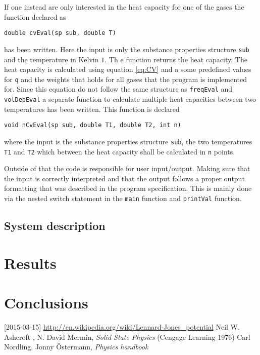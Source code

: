 \documentclass[11pt]{article}
\begin{document}
If one instead are only interested in the heat capacity for one of the gases the function declared as
\begin{lstlisting}
double cvEval(sp sub, double T)
\end{lstlisting} 
has been written. Here the input is only the substance properties structure \verb+sub+ and the temperature in Kelvin \verb+T+. Th e function returns the heat capacity. The heat capacity is calculated using equation \ref{eq:CV} and a some predefined values for \verb+q+ and the weights that holds for all gases that the program is implemented for. Since this equation do not follow the same structure as \verb+freqEval+ and \verb+volDepEval+ a separate function to calculate multiple heat capacities between two temperatures has been written. This function is declared
\begin{lstlisting}
void nCvEval(sp sub, double T1, double T2, int n)
\end{lstlisting}
where the input is the substance properties structure \verb+sub+, the two temperatures \verb+T1+ and \verb+T2+ which between the heat capacity shall be calculated in \verb+n+ points.  

Outside of that the code is responsible for user input/output. Making sure that the input is correctly interpreted and that the output follows a proper output formatting that was described in the program specification. This is mainly done via the nested switch statement in the \verb+main+ function and \verb+printVal+ function.
\subsection{System description}

\section{Results}

\section{Conclusions}
\begin{thebibliography}{99}
 [2015-03-15] \url{http://en.wikipedia.org/wiki/Lennard-Jones_potential}
 Neil W. Ashcroft , N. David Mermin, \textit{Solid State Physics} (Cengage Learning 1976)
 Carl Nordling, Jonny Östermann, \textit{Physics handbook}
\end{thebibliography}
\end{document}
